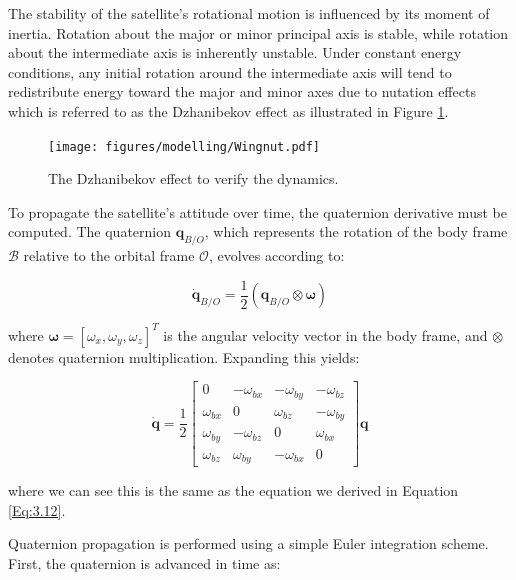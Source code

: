 \noindent The stability of the satellite's rotational motion is influenced by its moment of inertia. Rotation about the 
major or minor principal axis is stable, while rotation about the intermediate axis is inherently unstable. Under constant energy conditions, any 
initial rotation around the intermediate axis will tend to redistribute energy toward the major and minor axes due to nutation effects which is referred to as the
Dzhanibekov effect as illustrated in Figure \ref{fig:WingNut}.
\vspace{0.5cm}

\begin{figure}[H]
    \centering
    \texttt{[image: figures/modelling/Wingnut.pdf]}
    \caption{The Dzhanibekov effect to verify the dynamics.}
    \label{fig:WingNut}
\end{figure}


\noindent To propagate the satellite's attitude over time, the quaternion derivative must be computed. The quaternion $\mathbf{q}_{B/O}$, which represents the 
rotation of the body frame $\mathcal{B}$ relative to the orbital frame $\mathcal{O}$, evolves according to:

\begin{equation}
\dot{\mathbf{q}}_{B/O} = \frac{1}{2}(\mathbf{q}_{B/O} \otimes \boldsymbol{\omega})
\end{equation}

\noindent where $\boldsymbol{\omega} = [\omega_x, \omega_y, \omega_z]^T$ is the angular velocity vector in the body frame, and $\otimes$ denotes 
quaternion multiplication. Expanding this yields:

\begin{equation}
        \dot{\mathbf{q}}
    =
    \frac{1}{2}
    \begin{bmatrix}
        0 & -\omega_{bx} & -\omega_{by} & -\omega_{bz}\\
        \omega_{bx} & 0 & \omega_{bz} & -\omega_{by}\\
        \omega_{by} & -\omega_{bz} & 0 & \omega_{bx}\\
        \omega_{bz} & \omega_{by} & -\omega_{bx} & 0 
    \end{bmatrix}
        \mathbf{q}
\end{equation}

\noindent where we can see this is the same as the equation we derived in Equation \ref{Eq:3.12}.
\vspace{0.5cm}

\noindent Quaternion propagation is performed using a simple Euler integration scheme. First, the quaternion is advanced in time as:


